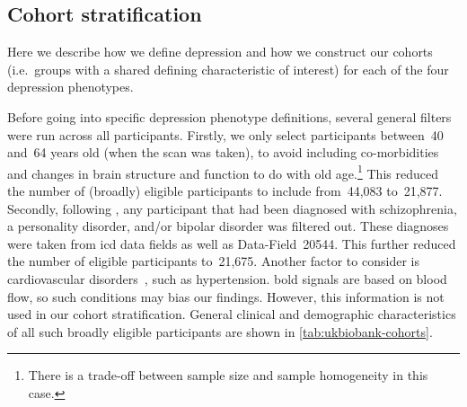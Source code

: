 \subsection{Cohort stratification}\label{subsec:cohort-stratification}

Here we describe how we define depression and how we construct our cohorts (i.e.~groups with a shared defining characteristic of interest) for each of the four depression phenotypes.

Before going into specific depression phenotype definitions, several general filters were run across all participants.
%
Firstly, we only select participants between~40 and~64 years old (when the scan was taken), to avoid including co-morbidities and changes in brain structure and function to do with old age.\footnote{There is a trade-off between sample size and sample homogeneity in this case.}
This reduced the number of (broadly) eligible participants to include from~44,083 to~21,877.
Secondly, following \textcite{Howard2020}, any participant that had been diagnosed with schizophrenia, a personality disorder, and/or bipolar disorder was filtered out.
These diagnoses were taken from \gls{icd} data fields as well as Data-Field~20544.
This further reduced the number of eligible participants to~21,675.
Another factor to consider is cardiovascular disorders~\parencite{Whooley2013}, such as hypertension.
\Gls{bold} signals are based on blood flow, so such conditions may bias our findings.
However, this information is not used in our cohort stratification.
General clinical and demographic characteristics of all such broadly eligible participants are shown in \cref{tab:ukbiobank-cohorts}.

